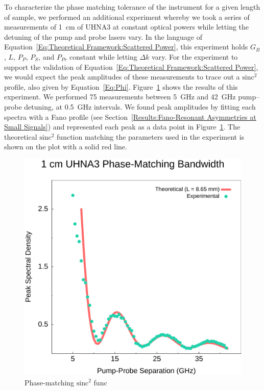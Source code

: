 To characterize the phase matching tolerance of the instrument for a given length of sample, we performed an additional experiment whereby we took a series of measurements of \SI{1}{\centi\meter} of UHNA3 at constant optical powers while letting the detuning of the pump and probe lasers vary. In the language of Equation~\ref{Eq:Theoretical Framework:Scattered Power}, this experiment holds \(G_B\), \(L\), \(P_P\), \(P_S\), and \(P_{Pr}\) constant while letting \(\Delta k\) vary. For the experiment to support the validation of Equation~\ref{Eq:Theoretical Framework:Scattered Power}, we would expect the peak amplitudes of these measurements to trace out a \(\mathrm{sinc^2}\) profile, also given by Equation~\ref{Eq:Phi}. Figure~\ref{fig:Phase-Match} shows the results of this experiment. We performed 75 measurements between \SI{5}{\giga\hertz} and \SI{42}{\giga\hertz} pump--probe detuning, at \SI{0.5}{\giga\hertz} intervals. We found peak amplitudes by fitting each spectra with a Fano profile (see Section~\ref{Results:Fano-Resonant Asymmetries at Small Signals}) and represented each peak as a data point in Figure~\ref{fig:Phase-Match}. The theoretical \(\mathrm{sinc^2}\) function matching the parameters used in the experiment is shown on the plot with a solid red line.


\begin{figure}[t!]
\centering
\includegraphics[width=\textwidth]{figs/4-CoBS/Phase-Match.pdf}
\caption{Phase-matching \(\mathrm{sinc^2}\) func}
\label{fig:Phase-Match}
\end{figure}

